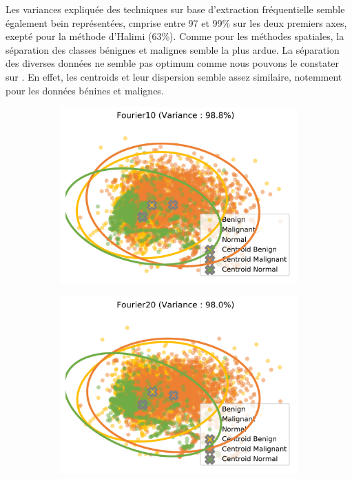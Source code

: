 Les variances expliquée des techniques sur base d'extraction fréquentielle semble également bein représentées, cmprise entre 97 et 99\% sur les deux premiers axes, exepté pour la méthode d'Halimi (63\%). Comme pour les méthodes spatiales, la séparation  des classes bénignes et malignes semble la plus ardue.
La séparation des diverses données ne semble pas optimum comme nous pouvons le constater sur . En effet, les centroids et leur dispersion semble assez similaire, notemment pour les données bénines et malignes.\par

\begin{figure}[H]
    \centering
    \begin{subfigure}{.45\textwidth}
      \includegraphics[width=\textwidth]{contents/chapter_4/resources/visualisation_frequency_Fourier10.png}
    \end{subfigure}
    \begin{subfigure}{.45\textwidth}
      \includegraphics[width=\textwidth]{contents/chapter_4/resources/visualisation_frequency_Fourier20.png}
    \end{subfigure}
    

\end{figure}
